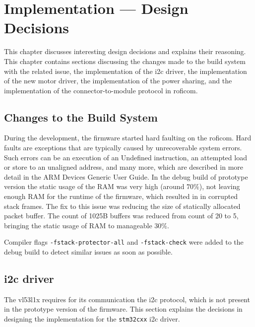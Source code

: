 \documentclass[
  digital,     %
  oneside,     %
  nosansbold,  %
  nocolorbold, %
  nolof,         %
  nolot,         %
]{fithesis4}
\newcommand{\TODO}[1]{\textcolor{red}{\textit{#1}}}
\newcommand{\TODOLIST}[1]{}
\begin{document}
{{{\chapter{ Implementation --- Design Decisions } \label{ch:design}
This chapter discusses interesting design decisions and explains their reasoning. This chapter contains sections discussing the changes made to the build system with the related issue, the implementation of the \acrshort{i2c} driver, the implementation of the new motor driver, the implementation of the power sharing, and the implementation of the connector-to-module protocol in \acrshort{roficom}.

\section{ Changes to the Build System }
\TODOLIST{
\begin{itemize}
    \item static buffer vs ram
    \item Hard fault = ram had too high static usage, minimizing the usage by lower the number of available buckets for packets solved this (memory::pool)
\end{itemize}
}

During the development, the firmware started hard faulting on the \acrshort{roficom}. Hard faults are exceptions that are typically caused by unrecoverable system errors. Such errors can be an execution of an Undefined instruction, an attempted load or store to an unaligned address, and many more, which are described in more detail in the ARM Devices Generic User Guide. In the debug build of prototype version the static usage of the RAM was very high (around $70\%$), not leaving enough RAM for the runtime of the firmware, which resulted in in corrupted stack frames. The fix to this issue was reducing the size of statically allocated packet buffer. The count of 1025B buffers was reduced from count of 20 to 5, bringing the static usage of RAM to manageable $30\%$.

Compiler flags \lstinline|-fstack-protector-all| and \lstinline|-fstack-check| were added to the debug build to detect similar issues as soon as possible.

\section[ I2C driver ]{ \acrshort{i2c} driver }

The \gls{vl53l1x} requires for its communication the \acrshort{i2c} protocol, which is not present in the prototype version of the firmware. This section explains the decisions in designing the implementation for the \lstinline|stm32cxx| \acrshort{i2c} driver. 

}}}
\end{document}
